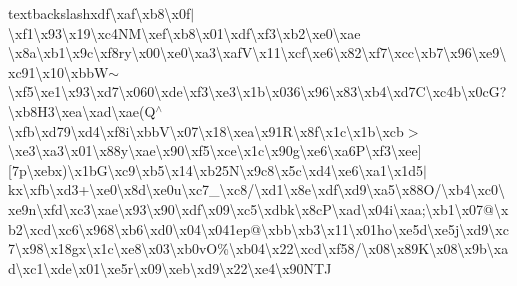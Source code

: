 textbackslash{}xdf\textbackslash{}xaf\textbackslash{}xb8\textbackslash{}x0f$\vert$\textbackslash{}xf1\textbackslash{}x93\textbackslash{}x19\textbackslash{}xc4\+N\+M\textbackslash{}xef\textbackslash{}xb8\textbackslash{}x01\textbackslash{}xdf\textbackslash{}xf3\textbackslash{}xb2\textbackslash{}xe0\textbackslash{}xae \textbackslash{}x8a\textbackslash{}xb1\textbackslash{}x9c\textbackslash{}xf8ry\textbackslash{}x00\textbackslash{}xe0\textbackslash{}xa3\textbackslash{}xaf\+V\textbackslash{}x11\textbackslash{}xcf\textbackslash{}xe6\textbackslash{}x82\textbackslash{}xf7\textbackslash{}xcc\textbackslash{}xb7\textbackslash{}x96\textbackslash{}xe9\textbackslash{}xc91\textbackslash{}x10\textbackslash{}xbb\+W$\sim$\textbackslash{}xf5\textbackslash{}xe1\textbackslash{}x93\textbackslash{}xd7\textbackslash{}x060\textbackslash{}xde\textbackslash{}xf3\textbackslash{}xe3\textbackslash{}x1b\textbackslash{}x036\textbackslash{}x96\textbackslash{}x83\textbackslash{}xb4\textbackslash{}xd7\+C\textbackslash{}xc4b\textbackslash{}x0c\+G?\textbackslash{}xb8\+H3\textbackslash{}xea\textbackslash{}xad\textbackslash{}xae(\+Q$^\wedge$\textbackslash{}xfb\textbackslash{}xd79\textbackslash{}xd4\textbackslash{}xf8i\textbackslash{}xbb\+V\textbackslash{}x07\textbackslash{}x18\textbackslash{}xea\textbackslash{}x91\+R\textbackslash{}x8f\textbackslash{}x1c\textbackslash{}x1b\textbackslash{}xcb$>$\textbackslash{}xe3\textbackslash{}xa3\textbackslash{}x01\textbackslash{}x88y\textbackslash{}xae\textbackslash{}x90\textbackslash{}xf5\textbackslash{}xce\textbackslash{}x1c\textbackslash{}x90g\textbackslash{}xe6\textbackslash{}xa6\+P\textbackslash{}xf3\textbackslash{}xee\mbox{]}\mbox{[}7p\textbackslash{}xebx)\textbackslash{}x1b\+G\textbackslash{}xc9\textbackslash{}xb5\textbackslash{}x14\textbackslash{}xb25\+N\textbackslash{}x9c8\textbackslash{}x5c\textbackslash{}xd4\textbackslash{}xe6\textbackslash{}xa1\textbackslash{}x1d5$\vert$kx\textbackslash{}xfb\textbackslash{}xd3+\textbackslash{}xe0\textbackslash{}x8d\textbackslash{}xe0u\textbackslash{}xc7\+\_\+\textbackslash{}xc8/\textbackslash{}xd1\textbackslash{}x8e\textbackslash{}xdf\textbackslash{}xd9\textbackslash{}xa5\textbackslash{}x88\+O/\textbackslash{}xb4\textbackslash{}xc0\textbackslash{}xe9n\textbackslash{}xfd\textbackslash{}xc3\textbackslash{}xae\textbackslash{}x93\textbackslash{}x90\textbackslash{}xdf\textbackslash{}x09\textbackslash{}xc5\textbackslash{}xdbk\textbackslash{}x8c\+P\textbackslash{}xad\textbackslash{}x04i\textbackslash{}xaa;\textbackslash{}xb1\textbackslash{}x07@\textbackslash{}xb2\textbackslash{}xcd\textbackslash{}xc6\textbackslash{}x968\textbackslash{}xb6\textbackslash{}xd0\textbackslash{}x04\textbackslash{}x041ep@\textbackslash{}xbb\textbackslash{}xb3\textbackslash{}x11\textbackslash{}x01ho\textbackslash{}xe5d\textbackslash{}xe5j\textbackslash{}xd9\textbackslash{}xc7\textbackslash{}x98\textbackslash{}x18gx\textbackslash{}x1c\textbackslash{}xe8\textbackslash{}x03\textbackslash{}xb0v\+O\%\textbackslash{}xb04\textbackslash{}x22\textbackslash{}xcd\textbackslash{}xf58/\textbackslash{}x08\textbackslash{}x89\+K\textbackslash{}x08\textbackslash{}x9b\textbackslash{}xad\textbackslash{}xc1\textbackslash{}xde\textbackslash{}x01\textbackslash{}xe5r\textbackslash{}x09\textbackslash{}xeb\textbackslash{}xd9\textbackslash{}x22\textbackslash{}xe4\textbackslash{}x90\+N\+T\+J